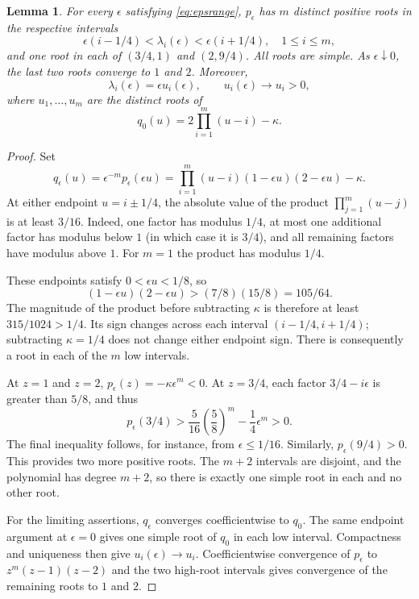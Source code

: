 \documentclass[11pt]{article}
\newtheorem{lemma}[theorem]{Lemma}
\begin{document}
\begin{lemma}\label{lem:roots}
For every $\epsilon$ satisfying \eqref{eq:epsrange}, $p_\epsilon$ has $m$ distinct positive roots in the respective intervals
\[
\epsilon(i-1/4)<\lambda_i(\epsilon)<\epsilon(i+1/4),\quad 1\le i\le m,
\]
and one root in each of $(3/4,1)$ and $(2,9/4)$. All roots are simple. As $\epsilon\downarrow0$, the last two roots converge to $1$ and $2$. Moreover,
\[
\lambda_i(\epsilon)=\epsilon u_i(\epsilon),\qquad u_i(\epsilon)\longrightarrow u_i>0,
\]
where $u_1,\ldots,u_m$ are the distinct roots of
\begin{equation}\label{eq:lowpoly}
q_0(u)=2\prod_{i=1}^m(u-i)-\kappa.
\end{equation}
\end{lemma}
\begin{proof}
Set
\[
q_\epsilon(u)=\epsilon^{-m}p_\epsilon(\epsilon u)
=\prod_{i=1}^m(u-i)(1-\epsilon u)(2-\epsilon u)-\kappa.
\]
At either endpoint $u=i\pm1/4$, the absolute value of the product $\prod_{j=1}^m(u-j)$ is at least $3/16$. Indeed, one factor has modulus $1/4$, at most one additional factor has modulus below $1$ (in which case it is $3/4$), and all remaining factors have modulus above $1$. For $m=1$ the product has modulus $1/4$.

These endpoints satisfy $0<\epsilon u<1/8$, so
\[
(1-\epsilon u)(2-\epsilon u)>(7/8)(15/8)=105/64.
\]
The magnitude of the product before subtracting $\kappa$ is therefore at least $315/1024>1/4$. Its sign changes across each interval $(i-1/4,i+1/4)$; subtracting $\kappa=1/4$ does not change either endpoint sign. There is consequently a root in each of the $m$ low intervals.

At $z=1$ and $z=2$, $p_\epsilon(z)=-\kappa\epsilon^m<0$. At $z=3/4$, each factor $3/4-i\epsilon$ is greater than $5/8$, and thus
\[
p_\epsilon(3/4)>\frac5{16}\left(\frac58\right)^m-\frac14\epsilon^m>0.
\]
The final inequality follows, for instance, from $\epsilon\le1/16$. Similarly, $p_\epsilon(9/4)>0$. This provides two more positive roots. The $m+2$ intervals are disjoint, and the polynomial has degree $m+2$, so there is exactly one simple root in each and no other root.

For the limiting assertions, $q_\epsilon$ converges coefficientwise to $q_0$. The same endpoint argument at $\epsilon=0$ gives one simple root of $q_0$ in each low interval. Compactness and uniqueness then give $u_i(\epsilon)\to u_i$. Coefficientwise convergence of $p_\epsilon$ to $z^m(z-1)(z-2)$ and the two high-root intervals gives convergence of the remaining roots to $1$ and $2$.
\end{proof}
\end{document}
